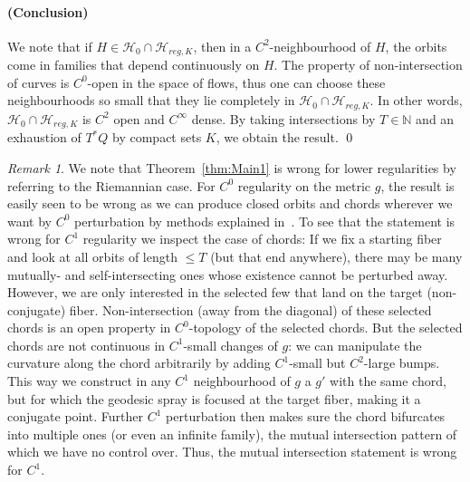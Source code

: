 \documentclass{amsart}
\newcommand{\Hcal}{{\mathcal{H}}}
\newcommand{\NN}{\mathbb{N}}
\theoremstyle{definition}
\theoremstyle{remark}
\newtheorem{remark}[proposition]{Remark}
\numberwithin{equation}{section}
\begin{document}
\paragraph{(Conclusion)} We note that if $H\in \Hcal_0\cap\Hcal_{reg,K}$, then in a $C^2$-neighbourhood of $H$, the orbits come in families that depend continuously on $H$. The property of non-intersection of curves is $C^0$-open in the space of flows, thus one can choose these neighbourhoods so small that they lie completely in $\Hcal_0\cap\Hcal_{reg,K}$. In other words, $\Hcal_0\cap \Hcal_{reg,K}$ is $C^2$ open and $C^\infty$ dense. By taking intersections by $T\in\NN$ and an exhaustion of $T^*Q$ by compact sets $K$, we obtain the result. 
\qed


\begin{remark} 
We note that Theorem~\ref{thm:Main1} is wrong for lower regularities by referring to the Riemannian case. For $C^0$ regularity on the metric $g$, the result is easily seen to be wrong as we can produce closed orbits and chords wherever we want by $C^0$ perturbation by methods explained in~\cite[Example 43]{ALMM}. 
To see that the statement is wrong for $C^1$ regularity we inspect the case of chords: If we fix a starting fiber and look at all orbits of length $\leq T$ (but that end anywhere), there may be many mutually- and self-intersecting ones whose existence cannot be perturbed away. However, we are only interested in the selected few that land on the target (non-conjugate) fiber. Non-intersection (away from the diagonal) of these selected chords is an open property in $C^0$-topology of the selected chords. But the selected chords are not continuous in $C^1$-small changes of $g$: we can manipulate the curvature along the chord arbitrarily by adding $C^1$-small but $C^2$-large bumps. This way we construct in any $C^1$ neighbourhood of $g$ a $g'$ with the same chord, but for which the geodesic spray is focused at the target fiber, making it a conjugate point. Further $C^1$ perturbation then makes sure the chord bifurcates into multiple ones (or even an infinite family), the mutual intersection pattern of which we have no control over. Thus, the mutual intersection statement is wrong for $C^1$.
\end{remark}
\end{document}
